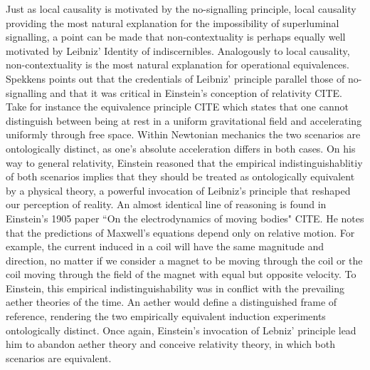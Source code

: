Just as local causality is motivated by the no-signalling principle, local causality providing the most natural explanation for the impossibility of superluminal signalling, a point can be made that non-contextuality is perhaps equally well motivated by Leibniz' Identity of indiscernibles. Analogously to local causality, non-contextuality is the most natural explanation for operational equivalences. Spekkens points out that the credentials of Leibniz' principle parallel those of no-signalling and that it was critical in Einstein's conception of relativity CITE. Take for instance the equivalence principle CITE which states that one cannot distinguish between being at rest in a uniform gravitational field and accelerating uniformly through free space. Within Newtonian mechanics the two scenarios are ontologically distinct, as one's absolute acceleration differs in both cases. On his way to general relativity, Einstein reasoned that the empirical indistinguishablitiy of both scenarios implies that they should be treated as ontologically equivalent by a physical theory, a powerful invocation of Leibniz's principle that reshaped our perception of reality. An almost identical line of reasoning is found in Einstein’s 1905 paper ``On the electrodynamics of moving bodies" CITE. He notes that the predictions of Maxwell's equations depend only on relative motion. For example, the current induced in a coil will have the same magnitude and direction, no matter if we consider a magnet to be moving through the coil or the coil moving through the field of the magnet with equal but opposite velocity. To Einstein, this empirical indistinguishability was in conflict with the prevailing aether theories of the time. An aether would define a distinguished frame of reference, rendering the two empirically equivalent induction experiments ontologically distinct. Once again, Einstein's invocation of Lebniz' principle lead him to abandon aether theory and conceive relativity theory, in which both scenarios are equivalent.

